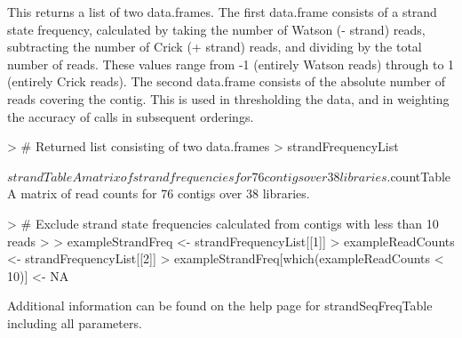 \documentclass{article}
\begin{document}
\begin{Schunk}
\end{Schunk}

This returns a list of two data.frames.  The first data.frame consists of a strand state frequency, calculated by taking the number of Watson (- strand) reads, subtracting the number of Crick (+ strand) reads, and dividing by the total number of reads.  These values range from -1 (entirely Watson reads) through to 1 (entirely Crick reads).  The second data.frame consists of the absolute number of reads covering the contig. This is used in thresholding the data, and in weighting the accuracy of calls in subsequent orderings.

\begin{Schunk}
\begin{Sinput}
> # Returned list consisting of two data.frames
> strandFrequencyList
\end{Sinput}
\begin{Soutput}
$strandTable
A matrix of strand frequencies for  76  contigs over  38  libraries.

$countTable
A matrix of read counts for  76  contigs over  38  libraries.
\end{Soutput}
\begin{Sinput}
> # Exclude strand state frequencies calculated from contigs with less than 10 reads
> 
> exampleStrandFreq <- strandFrequencyList[[1]]
> exampleReadCounts <- strandFrequencyList[[2]]
> exampleStrandFreq[which(exampleReadCounts < 10)] <- NA 
\end{Sinput}
\end{Schunk}

Additional information can be found on the help page for strandSeqFreqTable including all parameters.
\end{document}
